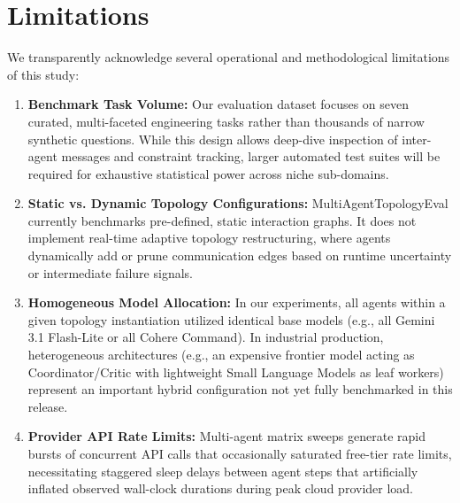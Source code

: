 \section{Limitations}
\label{sec:limitations}

We transparently acknowledge several operational and methodological limitations of this study:

\begin{enumerate}
    \item \textbf{Benchmark Task Volume:} Our evaluation dataset focuses on seven curated, multi-faceted engineering tasks rather than thousands of narrow synthetic questions. While this design allows deep-dive inspection of inter-agent messages and constraint tracking, larger automated test suites will be required for exhaustive statistical power across niche sub-domains.
    \item \textbf{Static vs. Dynamic Topology Configurations:} MultiAgentTopologyEval currently benchmarks pre-defined, static interaction graphs. It does not implement real-time adaptive topology restructuring, where agents dynamically add or prune communication edges based on runtime uncertainty or intermediate failure signals.
    \item \textbf{Homogeneous Model Allocation:} In our experiments, all agents within a given topology instantiation utilized identical base models (e.g., all Gemini 3.1 Flash-Lite or all Cohere Command). In industrial production, heterogeneous architectures (e.g., an expensive frontier model acting as Coordinator/Critic with lightweight Small Language Models as leaf workers) represent an important hybrid configuration not yet fully benchmarked in this release.
    \item \textbf{Provider API Rate Limits:} Multi-agent matrix sweeps generate rapid bursts of concurrent API calls that occasionally saturated free-tier rate limits, necessitating staggered sleep delays between agent steps that artificially inflated observed wall-clock durations during peak cloud provider load.
\end{enumerate}

